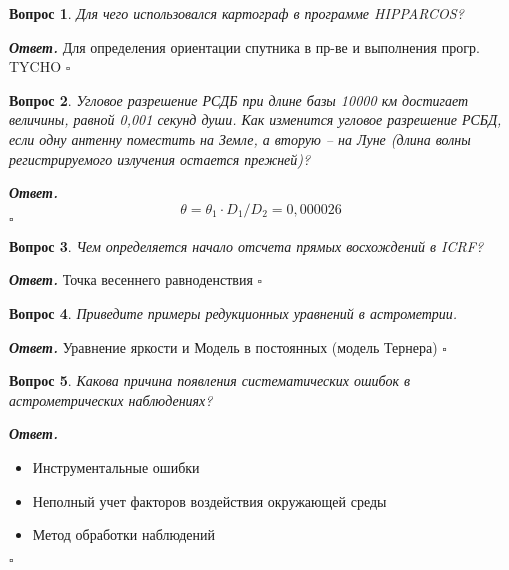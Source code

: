 \documentclass[12pt]{article}
\newtheorem{problem}{Вопрос}
\newenvironment{solution}[1][\it{Ответ}]{\textbf{#1. } }{$\square$}
\begin{document}
		\begin{problem}
			 Для чего использовался картограф в
			программе HIPPARCOS? 
		\end{problem}
		
		\begin{solution}
			Для
			определения ориентации спутника в пр-ве
			и выполнения прогр. TYCHO
		\end{solution}
		
		\begin{problem}
			Угловое разрешение РСДБ при длине
			базы 10000 км достигает величины,
			равной 0,001 секунд души. Как изменится
			угловое разрешение РСБД, если одну
			антенну поместить на Земле, а вторую –
			на Луне
			(длина волны регистрируемого излучения
			остается прежней)?
		\end{problem}
		
		\begin{solution}
			$$\theta= \theta_1\cdot D_1/D_2=0,000026$$
		\end{solution}
		
		\begin{problem}
			Чем определяется начало отсчета
			прямых восхождений в ICRF?
		\end{problem}
		
		\begin{solution}
			Точка весеннего равноденствия
		\end{solution}
		
		\begin{problem}
			Приведите примеры редукционных
			уравнений в астрометрии.
		\end{problem}
		
		\begin{solution}
			Уравнение яркости и Модель в постоянных (модель Тернера)		
		\end{solution}
		
		\begin{problem}
			Какова причина появления
			систематических ошибок в
			астрометрических
			наблюдениях?
		\end{problem}
		
		\begin{solution}
			
			\begin{itemize}
				\item Инструментальные ошибки
				\item  Неполный учет факторов воздействия окружающей среды
				\item  Метод обработки наблюдений
			\end{itemize}		
		\end{solution}
		
\end{document}

